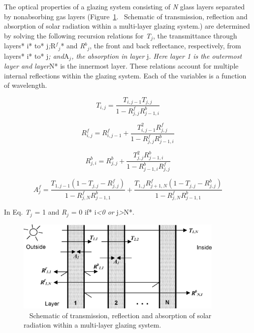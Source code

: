 The optical properties of a glazing system consisting of \emph{N} glass layers separated by nonabsorbing gas layers (Figure~\ref{fig:schematic-of-transmission-reflection}.~ Schematic of transmission, reflection and absorption of solar radiation within a multi-layer glazing system.) are determined by solving the following recursion relations for \emph{T\(_{j}\)}, the transmittance through layers* i* to* j\emph{;}R\(^{f}\)\(_{j}\)* and \emph{R\(^{b}\)\(_{j}\)}, the front and back reflectance, respectively, from layers* i* to* j\emph{; and}A\(_{j}\)\emph{, the absorption in layer} j\emph{. Here layer 1 is the outermost layer and layer}N* is the innermost layer. These relations account for multiple internal reflections within the glazing system. Each of the variables is a function of wavelength.

\begin{equation}
{T_{i,j}} = \frac{{{T_{i,j - 1}}{T_{j,j}}}}{{1 - R_{j,j}^fR_{j - 1,i}^b}}
\end{equation}

\begin{equation}
R_{i,j}^f = R_{i,j - 1}^f + \frac{{T_{i,j - 1}^2R_{j,j}^f}}{{1 - R_{j,j}^fR_{j - 1,i}^b}}
\end{equation}

\begin{equation}
R_{j,i}^b = R_{j,j}^b + \frac{{T_{j,j}^2R_{j - 1,i}^b}}{{1 - R_{j - 1,i}^bR_{j,j}^f}}
\end{equation}

\begin{equation}
A_j^f = \frac{{{T_{1,j - 1}}(1 - {T_{j,j}} - R_{j,j}^f)}}{{1 - R_{j,N}^fR_{j - 1,1}^b}} + \frac{{{T_{1,j}}R_{j + 1,N}^f(1 - {T_{j,j}} - R_{j,j}^b)}}{{1 - R_{j,N}^fR_{j - 1,1}^b}}
\end{equation}

In Eq. \emph{T\(_{j}\)} = 1 and \emph{R\(_{j}\)} = 0 if* i\emph{\textless{}0 or} j\emph{\textgreater{}}N*.

\begin{figure}[hbtp] %
\centering
\includegraphics[width=0.9\textwidth, height=0.9\textheight, keepaspectratio=true]{media/image956.png}
\caption{  Schematic of transmission, reflection and absorption of solar radiation within a multi-layer glazing system. \protect \label{fig:schematic-of-transmission-reflection}}
\end{figure}

